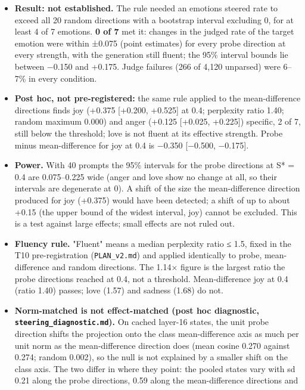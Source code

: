 \documentclass[
  10pt,
]{article}
\providecommand{\tightlist}{%
  \setlength{\itemsep}{0pt}\setlength{\parskip}{0pt}}
\begin{document}
\begin{itemize}
\tightlist
\item
  \textbf{Result: not established.} The rule needed an
  emotion\textquotesingle s steered rate to exceed all 20 random
  directions\textquotesingle{} with a bootstrap interval excluding 0,
  for at least 4 of 7 emotions. \textbf{0 of 7} met it: changes in the
  judged rate of the target emotion were within ±0.075 (point estimates)
  for every probe direction at every strength, with the generation still
  fluent; the 95\% interval bounds lie between −0.150 and +0.175. Judge
  failures (266 of 4,120 unparsed) were 6--7\% in every condition.
\item
  \textbf{Post hoc, not pre-registered:} the same rule applied to the
  mean-difference directions finds joy (+0.375 {[}+0.200, +0.525{]} at
  0.4; perplexity ratio 1.40; random maximum 0.000) and anger (+0.125
  {[}+0.025, +0.225{]}) specific, 2 of 7, still below the threshold;
  love is not fluent at its effective strength. Probe minus
  mean-difference for joy at 0.4 is −0.350 {[}−0.500, −0.175{]}.
\item
  \textbf{Power.} With 40 prompts the 95\% intervals for the probe
  directions at S* = 0.4 are 0.075--0.225 wide (anger and love show no
  change at all, so their intervals are degenerate at 0). A shift of the
  size the mean-difference direction produced for joy (+0.375) would
  have been detected; a shift of up to about +0.15 (the upper bound of
  the widest interval, joy) cannot be excluded. This is a test against
  large effects; small effects are not ruled out.
\item
  \textbf{Fluency rule.} "Fluent" means a median perplexity ratio ≤ 1.5,
  fixed in the T10 pre-registration (\texttt{PLAN\_v2.md}) and applied
  identically to probe, mean-difference and random directions. The 1.14×
  figure is the largest ratio the probe directions reached at 0.4, not a
  threshold. Mean-difference joy at 0.4 (ratio 1.40) passes; love (1.57)
  and sadness (1.68) do not.
\item
  \textbf{Norm-matched is not effect-matched (post hoc diagnostic,
  \texttt{steering\_diagnostic.md}).} On cached layer-16 states, the
  unit probe direction shifts the projection onto the class
  mean-difference axis as much per unit norm as the mean-difference
  direction does (mean cosine 0.270 against 0.274; random 0.002), so the
  null is not explained by a smaller shift on the class axis. The two
  differ in where they point: the pooled states vary with sd 0.21 along
  the probe directions, 0.59 along the mean-difference directions and

\end{itemize}
\end{document}
